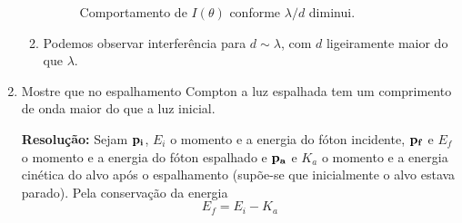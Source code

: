 \documentclass[a4paper, 12pt, notitlepage]{article}
\begin{document}
\begin{enumerate}
\begin{enumerate}
    \begin{figure}[!h]
    \begin{minipage}[l]{0.32\linewidth}
    \centering
    \end{minipage}
    \begin{minipage}[c]{0.32\linewidth}
    \centering
    \end{minipage}
    \begin{minipage}[r]{0.32\linewidth}
    \centering
    \end{minipage}
    \caption{Comportamento de $I(\theta)$ conforme $\lambda/d$ diminui.}
    \label{fig:comp.I.diminui}
  \end{figure}
  
  \item Podemos observar interferência para $d \sim \lambda$, com $d$ ligeiramente maior do que $\lambda$.

\end{enumerate}
 
\item Mostre que no espalhamento Compton a luz espalhada tem um comprimento de onda maior do que a luz inicial.

\textbf{Resolução: } \linebreak
Sejam $\vb{p_i}$, $E_i$ o momento e a energia do fóton incidente, $\vb{p_f}$ e $E_f$ o momento e a energia do fóton espalhado e $\vb{p_a}$ e $K_a$ o momento e a energia cinética do alvo após o espalhamento (supõe-se que inicialmente o alvo estava parado). Pela conservação da energia
\begin{equation*}
E_f = E_i - K_a
\end{equation*}


\end{enumerate}
\end{document}
